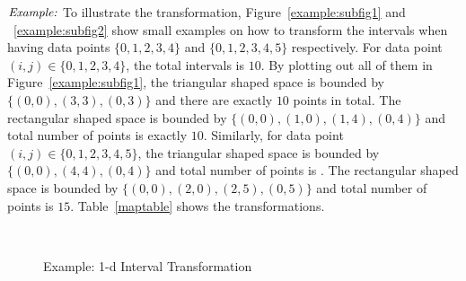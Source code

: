 \documentclass[10pt,journal,cspaper,compsoc]{IEEEtran}
\begin{document}
$\noindent \textit {Example:}$ To illustrate the transformation, Figure~\ref{example:subfig1} and ~\ref{example:subfig2} show small examples on how to transform the intervals when having data points $\{0,1,2,3,4\}$ and $\{0,1,2,3,4,5\}$ respectively. For data point $(i,j)\in \{0,1,2,3,4\}$, the total intervals is $10$. By plotting out all of them in Figure~\ref{example:subfig1}, the triangular shaped space is bounded by $\{(0,0), (3,3), (0,3)\}$ and there are exactly $10$ points in total. The rectangular shaped space is bounded by $\{(0,0),(1,0), (1,4),(0,4)\}$ and total number of points is exactly $10$. Similarly, for data point $(i,j)\in \{0,1,2,3,4,5\}$,  the triangular shaped space is bounded by $\{(0,0),(4,4),(0,4)\}$ and total number of points is . The rectangular shaped space is bounded by $\{(0,0),(2,0),(2,5),(0,5)\}$ and total number of points is $15$. Table~\ref{maptable} shows the transformations.

\begin{figure}[h]
\centering
{}
~~
\caption{Example: 1-d Interval Transformation}\label{example}
\end{figure}
\end{document}
